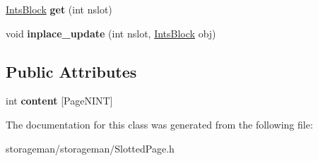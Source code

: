 \begin{DoxyCompactItemize}
\item 
\hypertarget{classmia_1_1sm_1_1_slotted_page_a822783b7cf14b6c35d09bb2f46643b6f}{\hyperlink{classmia_1_1sm_1_1_ints_block}{Ints\-Block} {\bfseries get} (int nslot)}\label{classmia_1_1sm_1_1_slotted_page_a822783b7cf14b6c35d09bb2f46643b6f}

\item 
\hypertarget{classmia_1_1sm_1_1_slotted_page_af4a20669578633c2fd76481f1746bd44}{void {\bfseries inplace\-\_\-update} (int nslot, \hyperlink{classmia_1_1sm_1_1_ints_block}{Ints\-Block} obj)}\label{classmia_1_1sm_1_1_slotted_page_af4a20669578633c2fd76481f1746bd44}

\end{DoxyCompactItemize}
\subsection*{Public Attributes}
\begin{DoxyCompactItemize}
\item 
\hypertarget{classmia_1_1sm_1_1_slotted_page_a92c127950887b76359fe5832a3ab04c2}{int {\bfseries content} \mbox{[}Page\-N\-I\-N\-T\mbox{]}}\label{classmia_1_1sm_1_1_slotted_page_a92c127950887b76359fe5832a3ab04c2}

\end{DoxyCompactItemize}


The documentation for this class was generated from the following file\-:\begin{DoxyCompactItemize}
\item 
storageman/storageman/Slotted\-Page.\-h\end{DoxyCompactItemize}
